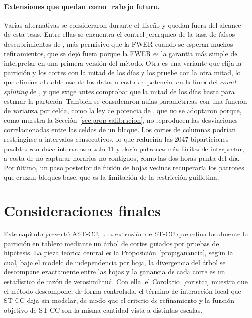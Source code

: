 \paragraph{Extensiones que quedan como trabajo futuro.} Varias alternativas se
consideraron durante el diseño y quedan fuera del alcance de esta tesis.
Entre ellas se encuentra el control jerárquico de la tasa de falsos descubrimientos de
\citet{Yekutieli2008}, más permisivo que la \ac{FWER} cuando se esperan muchos
refinamientos, que se dejó fuera porque la \ac{FWER} es la garantía más simple de
interpretar en una primera versión del método. Otra es una variante que elija la
partición y los cortes con la mitad de los días y los pruebe con la otra mitad, lo
que elimina el doble uso de los datos a costa de potencia, en la línea del
\emph{count splitting} de \citet{Neufeld2024cs}, y que exige antes comprobar que la
mitad de los días basta para estimar la partición. También se consideraron nulas
paramétricas con una función de varianza por celda, como la ley de potencia de
\citet{Taylor1961}, que no se adoptaron porque, como muestra la
Sección~\ref{sec:prop-calibracion}, no reproducen las desviaciones correlacionadas
entre las celdas de un bloque. Los cortes de columnas podrían restringirse a
intervalos consecutivos, lo que reduciría las 2047 biparticiones posibles con doce
intervalos a solo 11 y daría patrones más fáciles de interpretar, a costa de no
capturar horarios no contiguos, como las dos horas punta del día. Por último, un
paso posterior de fusión de hojas vecinas recuperaría los patrones que cruzan
bloques base, que es la limitación de la restricción guillotina.

\section{Consideraciones finales}\label{sec:prop-final}

Este capítulo presentó AST-CC, una extensión de ST-CC que refina localmente la
partición en tablero mediante un árbol de cortes guiados por pruebas de
hipótesis. La pieza teórica central es la
Proposición~\ref{prop:ganancia}, según la cual, bajo el modelo de independencia por hoja, la
divergencia del árbol se descompone exactamente entre las hojas y la ganancia de
cada corte es un estadístico de razón de verosimilitud. Con ella, el
Corolario~\ref{cor:stcc} muestra que el método descompone, de forma controlada,
el término de interacción local que ST-CC deja sin modelar, de modo que el
criterio de refinamiento y la función objetivo de ST-CC son la misma cantidad
vista a distintas escalas.

